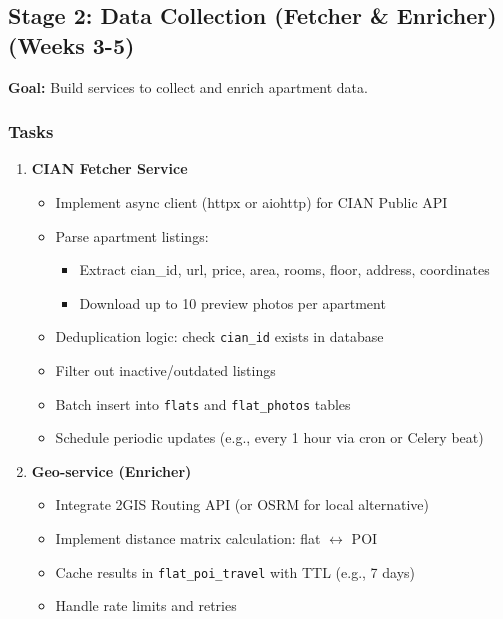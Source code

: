 \documentclass[12pt,a4paper]{article}
\begin{document}
\subsection{Stage 2: Data Collection (Fetcher \& Enricher) (Weeks 3-5)}

\textbf{Goal:} Build services to collect and enrich apartment data.

\subsubsection{Tasks}

\begin{enumerate}
    \item \textbf{CIAN Fetcher Service}
    \begin{itemize}
        \item Implement async client (httpx or aiohttp) for CIAN Public API
        \item Parse apartment listings:
        \begin{itemize}
            \item Extract cian\_id, url, price, area, rooms, floor, address, coordinates
            \item Download up to 10 preview photos per apartment
        \end{itemize}
        \item Deduplication logic: check \texttt{cian\_id} exists in database
        \item Filter out inactive/outdated listings
        \item Batch insert into \texttt{flats} and \texttt{flat\_photos} tables
        \item Schedule periodic updates (e.g., every 1 hour via cron or Celery beat)
    \end{itemize}
    
    \item \textbf{Geo-service (Enricher)}
    \begin{itemize}
        \item Integrate 2GIS Routing API (or OSRM for local alternative)
        \item Implement distance matrix calculation: flat $\leftrightarrow$ POI
        \item Cache results in \texttt{flat\_poi\_travel} with TTL (e.g., 7 days)
        \item Handle rate limits and retries
    \end{itemize}
    

\end{enumerate}
\end{document}
